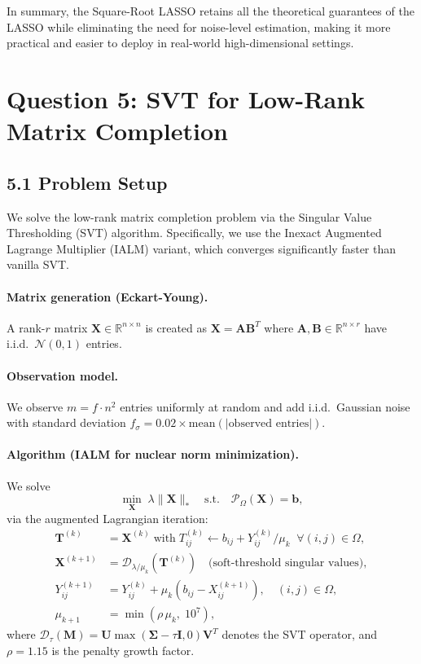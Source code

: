 \documentclass[11pt]{article}
\begin{document}
In summary, the Square-Root LASSO retains all the theoretical guarantees of the LASSO
while eliminating the need for noise-level estimation, making it more practical and
easier to deploy in real-world high-dimensional settings.

\newpage
\section*{Question 5: SVT for Low-Rank Matrix Completion}

\subsection*{5.1 Problem Setup}

We solve the low-rank matrix completion problem via the Singular Value Thresholding
(SVT) algorithm.  Specifically, we use the Inexact Augmented Lagrange Multiplier (IALM)
variant, which converges significantly faster than vanilla SVT.

\paragraph{Matrix generation (Eckart-Young).}
A rank-$r$ matrix $\boldsymbol{X} \in \mathbb{R}^{n \times n}$ is created as
$\boldsymbol{X} = \boldsymbol{A}\boldsymbol{B}^T$ where
$\boldsymbol{A}, \boldsymbol{B} \in \mathbb{R}^{n \times r}$ have i.i.d.\
$\mathcal{N}(0,1)$ entries.

\paragraph{Observation model.}
We observe $m = f \cdot n^2$ entries uniformly at random and add i.i.d.\ Gaussian noise
with standard deviation $f_\sigma = 0.02 \times \text{mean}(|\text{observed entries}|)$.

\paragraph{Algorithm (IALM for nuclear norm minimization).}
We solve
\[
\min_{\boldsymbol{X}} \;\lambda\|\boldsymbol{X}\|_* \quad\text{s.t.}\quad
\mathcal{P}_\Omega(\boldsymbol{X}) = \boldsymbol{b},
\]
via the augmented Lagrangian iteration:
\begin{align}
\boldsymbol{T}^{(k)} &= \boldsymbol{X}^{(k)}\;\text{with}\;
T^{(k)}_{ij} \leftarrow b_{ij} + Y^{(k)}_{ij}/\mu_k \;\;\forall (i,j)\in\Omega,\\
\boldsymbol{X}^{(k+1)} &= \mathcal{D}_{\lambda/\mu_k}\!\left(\boldsymbol{T}^{(k)}\right)
\quad\text{(soft-threshold singular values)},\\
Y^{(k+1)}_{ij} &= Y^{(k)}_{ij} + \mu_k(b_{ij} - X^{(k+1)}_{ij}),\quad (i,j)\in\Omega,\\
\mu_{k+1} &= \min(\rho\,\mu_k,\; 10^7),
\end{align}
where $\mathcal{D}_\tau(\boldsymbol{M}) = \boldsymbol{U}\max(\boldsymbol{\Sigma}-\tau\boldsymbol{I},0)\boldsymbol{V}^T$
denotes the SVT operator, and $\rho = 1.15$ is the penalty growth factor.
\end{document}
